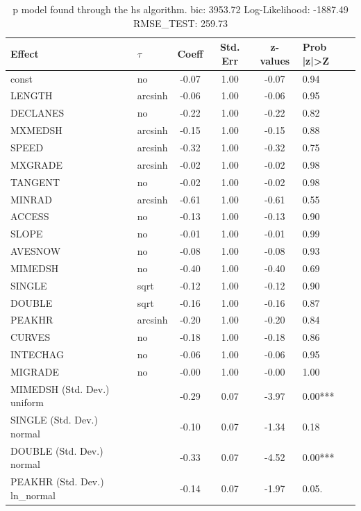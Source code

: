 \begin{table}
	\caption{p model found through the hs algorithm. bic: 3953.72 Log-Likelihood: -1887.49 RMSE_TEST: 259.73}
	\begin{center}
		\begin{tabular}{|l|l|c|c|c|l|}
			\hline
			Effect & $\tau$ & Coeff & Std. Err & z-values & Prob |z|>Z \\
			\hline
			const & no & -0.07 & 1.00 & -0.07 & 0.94 \\
			\hline
			LENGTH & arcsinh & -0.06 & 1.00 & -0.06 & 0.95 \\
			\hline
			DECLANES & no & -0.22 & 1.00 & -0.22 & 0.82 \\
			\hline
			MXMEDSH & arcsinh & -0.15 & 1.00 & -0.15 & 0.88 \\
			\hline
			SPEED & arcsinh & -0.32 & 1.00 & -0.32 & 0.75 \\
			\hline
			MXGRADE & arcsinh & -0.02 & 1.00 & -0.02 & 0.98 \\
			\hline
			TANGENT & no & -0.02 & 1.00 & -0.02 & 0.98 \\
			\hline
			MINRAD & arcsinh & -0.61 & 1.00 & -0.61 & 0.55 \\
			\hline
			ACCESS & no & -0.13 & 1.00 & -0.13 & 0.90 \\
			\hline
			SLOPE & no & -0.01 & 1.00 & -0.01 & 0.99 \\
			\hline
			AVESNOW & no & -0.08 & 1.00 & -0.08 & 0.93 \\
			\hline
			MIMEDSH & no & -0.40 & 1.00 & -0.40 & 0.69 \\
			\hline
			SINGLE & sqrt & -0.12 & 1.00 & -0.12 & 0.90 \\
			\hline
			DOUBLE & sqrt & -0.16 & 1.00 & -0.16 & 0.87 \\
			\hline
			PEAKHR & arcsinh & -0.20 & 1.00 & -0.20 & 0.84 \\
			\hline
			CURVES & no & -0.18 & 1.00 & -0.18 & 0.86 \\
			\hline
			INTECHAG & no & -0.06 & 1.00 & -0.06 & 0.95 \\
			\hline
			MIGRADE & no & -0.00 & 1.00 & -0.00 & 1.00 \\
			\hline
			MIMEDSH (Std. Dev.) uniform &  & -0.29 & 0.07 & -3.97 & 0.00*** \\
			\hline
			SINGLE (Std. Dev.) normal &  & -0.10 & 0.07 & -1.34 & 0.18 \\
			\hline
			DOUBLE (Std. Dev.) normal &  & -0.33 & 0.07 & -4.52 & 0.00*** \\
			\hline
			PEAKHR (Std. Dev.) ln_normal &  & -0.14 & 0.07 & -1.97 & 0.05. \\

\end{tabular}
\end{center}
\end{table}
